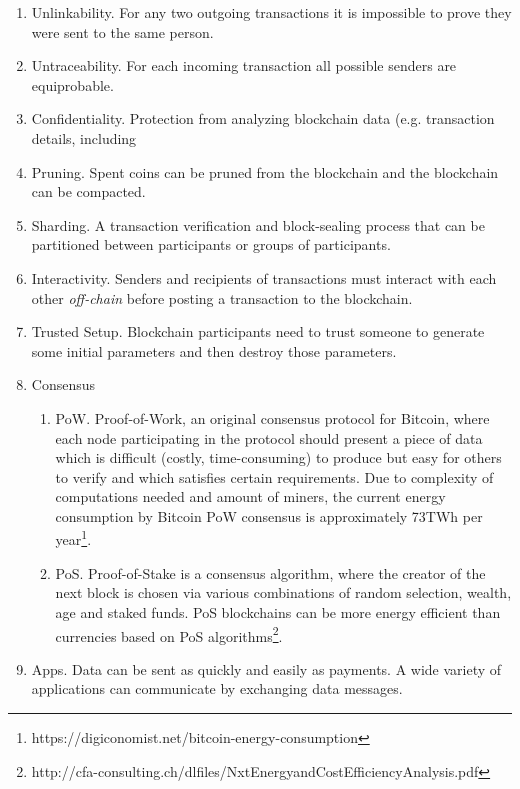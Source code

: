 \documentclass[8pt,fleqn,openany]{book}
\begin{document}
{		\begin{enumerate}
			\item Unlinkability. For any two outgoing transactions it is impossible to prove they were sent to the same person\cite{c2}.
			\item Untraceability. For each incoming transaction all possible senders are equiprobable\cite{c2}.
			\item Confidentiality. Protection from analyzing blockchain data (e.g. transaction details, including   	\item Pruning. Spent coins can be pruned from the blockchain and the blockchain can be compacted.
			\item Sharding. A transaction verification and block-sealing process that can be partitioned between participants or groups of participants.
			\item Interactivity. Senders and recipients of transactions must interact with each other \textit{off-chain} before posting a transaction to the blockchain.
			\item Trusted Setup. Blockchain participants need to trust someone to generate some initial parameters and then destroy those parameters.
			\item Consensus
			\begin{enumerate}
				\item PoW. Proof-of-Work, an original consensus protocol for Bitcoin, where each node participating in the protocol should present a piece of data which is difficult (costly, time-consuming) to produce but easy for others to verify and which satisfies certain requirements. Due to complexity of computations needed and amount of miners, the current energy consumption by Bitcoin PoW consensus is approximately 73TWh per year\footnote{https://digiconomist.net/bitcoin-energy-consumption}.
				\item PoS. Proof-of-Stake is a consensus algorithm, where the creator of the next block is chosen via various combinations of random selection, wealth, age and staked funds. PoS blockchains can be more energy efficient than currencies based on PoS algorithms\footnote{http://cfa-consulting.ch/dlfiles/NxtEnergyandCostEfficiencyAnalysis.pdf}.
			\end{enumerate}
			\item Apps. Data can be sent as quickly and easily as payments. A wide variety of applications can communicate by exchanging data messages. 
		\end{enumerate}
		
}
\end{document}
